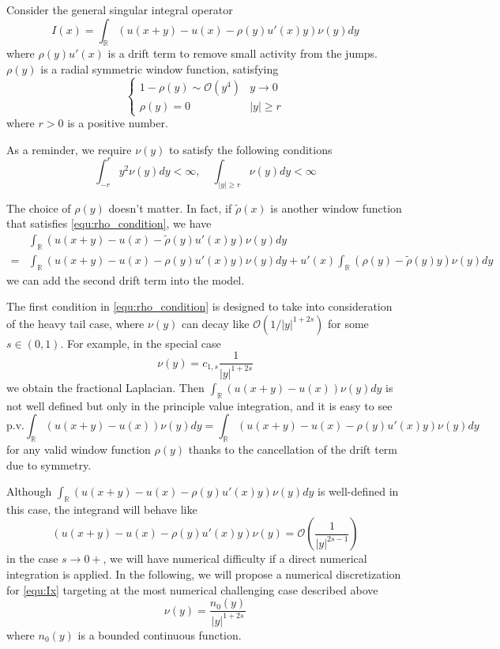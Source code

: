 \documentclass[10pt,a4paper]{article}
\newcommand{\RR}[0]{\mathbb{R}}
\theoremstyle{definition}
\begin{document}
Consider the general singular integral operator
\begin{equation}\label{equ:Ix}
	I(x) = \int_{\RR}(u(x+y)-u(x)-\rho(y)u'(x)y)\nu(y)dy
\end{equation}
where $\rho(y)u'(x)$ is a drift term to remove small activity from the jumps. $\rho(y)$ is a radial symmetric window function, satisfying
\begin{equation}\label{equ:rho_condition}
\begin{cases}
	1-\rho(y)\sim \mathcal{O}(y^4)& y\rightarrow 0\\
	\rho(y)=0 & |y|\geq r
\end{cases}
\end{equation}
where $r>0$ is a positive number. 

As a reminder, we require $\nu(y)$ to satisfy the following conditions
\begin{equation}\label{equ:ny}
	\int_{-r}^ry^2\nu(y)dy <\infty, \quad \int_{|y|\geq r} \nu(y)dy<\infty
\end{equation} 

The choice of $\rho(y)$ doesn't matter. In fact, if $\tilde\rho(x)$ is another window function that satisfies \cref{equ:rho_condition}, we have
\begin{align}
	&\int_{\RR}(u(x+y)-u(x)-\tilde\rho(y)u'(x)y)\nu(y)dy \\
	=& \int_{\RR}(u(x+y)-u(x)-\rho(y)u'(x)y)\nu(y)dy + u'(x)\int_{\RR}(\rho(y)-\tilde\rho(y)y)\nu(y)dy
\end{align}
we can add the second drift term into the model. 

The first condition in \cref{equ:rho_condition} is designed to take into consideration of the heavy tail case, where $\nu(y)$ can decay like $\mathcal{O}(1/|y|^{1+2s})$ for some $s\in (0,1)$. For example, in the special case
\begin{equation}
	\nu(y) = c_{1,s}\frac{1}{|y|^{1+2s}}
\end{equation}
we obtain the fractional Laplacian. Then $\int_{\RR}(u(x+y)-u(x))\nu(y)dy$ is not well defined but only in the principle value integration, and it is easy to see
\begin{equation}
	\mathrm{p.v.}\int_{\RR}(u(x+y)-u(x))\nu(y)dy = \int_{\RR}(u(x+y)-u(x)-\rho(y)u'(x)y)\nu(y)dy
\end{equation}
for any valid window function $\rho(y)$ thanks to the cancellation of the drift term due to symmetry. 

Although $\int_{\RR}(u(x+y)-u(x)-\rho(y)u'(x)y)\nu(y)dy$ is well-defined in this case, the integrand will behave like 
\begin{equation}
	(u(x+y)-u(x)-\rho(y)u'(x)y)\nu(y) = \mathcal{O}\left(\frac{1}{|y|^{2s-1}}\right)
\end{equation}
in the case $s\rightarrow 0+$, we will have numerical difficulty if a direct numerical integration is applied. In the following, we will propose a numerical discretization for \cref{equ:Ix} targeting at the most numerical challenging case described above 
\begin{equation}\label{equ:ny2}
	\nu(y) = \frac{n_0(y)}{|y|^{1+2s}}
\end{equation} 
where $n_0(y)$ is a bounded continuous function. 
\end{document}
